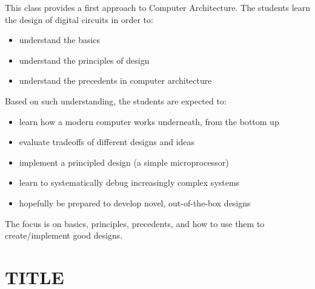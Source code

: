\documentclass[a4paper]{report}
\begin{document}
\begin{tcolorbox}[colback=dcWhite,colframe=dcGreen,title=\textbf{Objectives}]
    This class provides a first approach to Computer Architecture. The students learn the
    design of digital circuits in order to:
    \begin{itemize}
        \item understand the basics
        \item understand the principles of design
        \item understand the precedents in computer architecture
    \end{itemize}
\tcblower
    Based on such understanding, the students are expected to:
    \begin{itemize}
        \item learn how a modern computer works underneath, from the bottom up
        \item evaluate tradeoffs of different designs and ideas
        \item implement a principled design (a simple microprocessor) 
        \item learn to systematically debug increasingly complex systems
        \item hopefully be prepared to develop novel, out-of-the-box designs
    \end{itemize}
    
\end{tcolorbox}
\bigskip

The focus is on basics, principles, precedents, and how to use them to 
create/implement good designs.


\chapter{TITLE}
\end{document}
